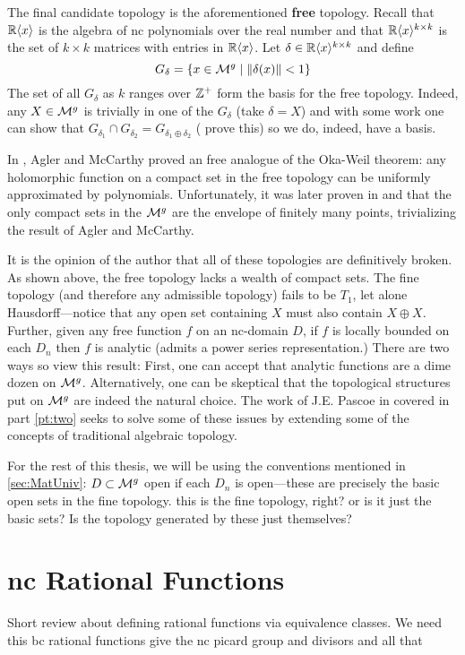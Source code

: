 The final candidate topology is the aforementioned \textbf{free} topology.
Recall that \(\mathbb{R} \langle x \rangle \) is the algebra of nc polynomials over the
real number and that
\(\mathbb{R} \langle x \rangle ^{k\times k}\) is the set of \(k \times k\) matrices
with entries in \(\mathbb{R} \langle x \rangle \). Let
\(\delta \in \mathbb{R} \langle x \rangle ^{k\times k}\) and define
\[
  G_\delta = \{x \in \mathcal{M}^{g} \mid \| \delta(x) \| <1\}
\]
The set of all \(G_\delta\) as \(k\) ranges over \(\mathbb{Z} ^+\) form the basis for
the free topology. Indeed, any \(X \in \mathcal{M}^{g} \) is trivially in one of the
\(G_\delta\) (take \(\delta=X\)) and with some work one can show that
\(G_{\delta_1} \cap G_{\delta_2}= G_{\delta_1\oplus \delta_2}\) ({\color{red}
  prove this}) so we do,
indeed, have a basis.

In \cite{aglerGlobal2013}, Agler and McCarthy proved an free analogue of the
Oka-Weil theorem: any holomorphic function on a compact set in the free topology
can be uniformly approximated by polynomials. Unfortunately, it was later proven
in \cite{pascoeentire2019} and \cite{augatCompact2017} that the only compact
sets in the \(\mathcal{M}^{g} \) are the envelope of finitely many points, trivializing
the result of Agler and McCarthy.

It is the opinion of the author that all of these topologies are definitively
broken. As shown above, the free topology lacks a wealth of compact sets.
The fine topology (and therefore any admissible topology)
fails to be \(T_1\), let alone Hausdorff---notice that any open set containing
\(X\) must also contain \(X\oplus X\). Further, given any free function \(f\)
on an nc-domain \(D\), if \(f\) is locally bounded on each \(D_n\) then \(f\)
is analytic (admits a power series representation.) There are two ways so view
this result: First, one can accept that analytic functions are a dime dozen on
\(\mathcal{M}^{g} \). Alternatively, one can be skeptical that the topological
structures put on \(\mathcal{M}^{g} \) are indeed the natural choice. The work of J.E.
Pascoe in \cite{pascoeFreeNoncommutativePrincipal2020} covered in part
\ref{pt:two} seeks to solve some of these issues by extending some of the
concepts of traditional algebraic topology.

For the rest of this thesis, we will be using the conventions mentioned in
\cref{sec:MatUniv}: \( D \subset\mathcal{M}^{g} \) open if each \(D_n\) is open---these
are precisely the basic open sets in the fine topology.
{\color{red} this is the fine topology, right? or is it just the basic sets? Is
  the topology generated by these just themselves?}


\section{nc Rational Functions}%
\label{sec:ncrational}

{\color{blue} Short review about defining rational functions via equivalence
  classes. We need this bc rational functions give the nc picard group and
  divisors and all that }
